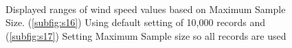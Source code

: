 \documentclass[12pt]{article}
\begin{document}
\begin{figure}[H]
\centering
{}\\
\caption{Displayed ranges of wind speed values based on Maximum Sample Size. (\ref{subfig:s16}) Using default setting of 10,000 records and (\ref{subfig:s17}) Setting Maximum Sample size so all records are used}
\label{fig:Figure17}
\end{figure}
\end{document}
